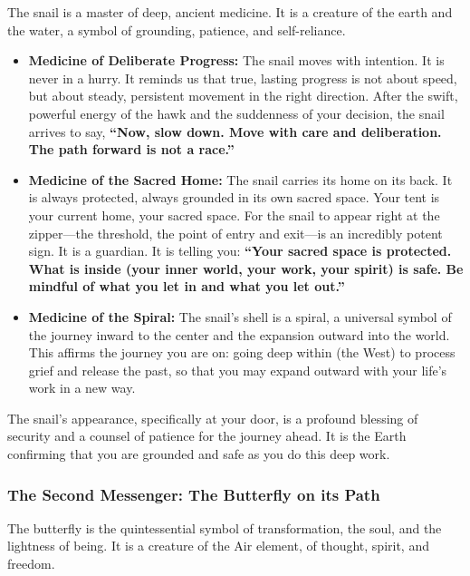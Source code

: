 \documentclass{article}
\begin{document}
The snail is a master of deep, ancient medicine. It is a creature of the earth and the water, a symbol of grounding, patience, and self-reliance.

\begin{itemize}
\item
  \textbf{Medicine of Deliberate Progress:} The snail moves with intention. It is never in a hurry. It reminds us that true, lasting progress is not about speed, but about steady, persistent movement in the right direction. After the swift, powerful energy of the hawk and the suddenness of your decision, the snail arrives to say, \textbf{``Now, slow down. Move with care and deliberation. The path forward is not a race.''}
\item
  \textbf{Medicine of the Sacred Home:} The snail carries its home on its back. It is always protected, always grounded in its own sacred space. Your tent is your current home, your sacred space. For the snail to appear right at the zipper---the threshold, the point of entry and exit---is an incredibly potent sign. It is a guardian. It is telling you: \textbf{``Your sacred space is protected. What is inside (your inner world, your work, your spirit) is safe. Be mindful of what you let in and what you let out.''}
\item
  \textbf{Medicine of the Spiral:} The snail's shell is a spiral, a universal symbol of the journey inward to the center and the expansion outward into the world. This affirms the journey you are on: going deep within (the West) to process grief and release the past, so that you may expand outward with your life's work in a new way.
\end{itemize}

The snail's appearance, specifically at your door, is a profound blessing of security and a counsel of patience for the journey ahead. It is the Earth confirming that you are grounded and safe as you do this deep work.

\subsubsection*{The Second Messenger: The Butterfly on its Path}\label{the-second-messenger-the-butterfly-on-its-path}

The butterfly is the quintessential symbol of transformation, the soul, and the lightness of being. It is a creature of the Air element, of thought, spirit, and freedom.
\end{document}
